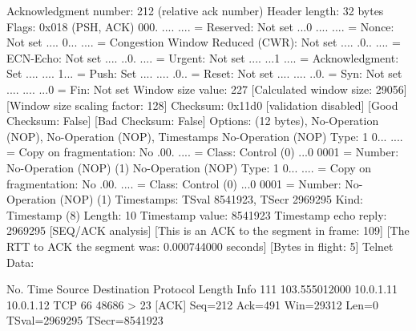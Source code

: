     Acknowledgment number: 212    (relative ack number)
    Header length: 32 bytes
    Flags: 0x018 (PSH, ACK)
        000. .... .... = Reserved: Not set
        ...0 .... .... = Nonce: Not set
        .... 0... .... = Congestion Window Reduced (CWR): Not set
        .... .0.. .... = ECN-Echo: Not set
        .... ..0. .... = Urgent: Not set
        .... ...1 .... = Acknowledgment: Set
        .... .... 1... = Push: Set
        .... .... .0.. = Reset: Not set
        .... .... ..0. = Syn: Not set
        .... .... ...0 = Fin: Not set
    Window size value: 227
    [Calculated window size: 29056]
    [Window size scaling factor: 128]
    Checksum: 0x11d0 [validation disabled]
        [Good Checksum: False]
        [Bad Checksum: False]
    Options: (12 bytes), No-Operation (NOP), No-Operation (NOP), Timestamps
        No-Operation (NOP)
            Type: 1
                0... .... = Copy on fragmentation: No
                .00. .... = Class: Control (0)
                ...0 0001 = Number: No-Operation (NOP) (1)
        No-Operation (NOP)
            Type: 1
                0... .... = Copy on fragmentation: No
                .00. .... = Class: Control (0)
                ...0 0001 = Number: No-Operation (NOP) (1)
        Timestamps: TSval 8541923, TSecr 2969295
            Kind: Timestamp (8)
            Length: 10
            Timestamp value: 8541923
            Timestamp echo reply: 2969295
    [SEQ/ACK analysis]
        [This is an ACK to the segment in frame: 109]
        [The RTT to ACK the segment was: 0.000744000 seconds]
        [Bytes in flight: 5]
Telnet
    Data: 

No.     Time           Source                Destination           Protocol Length Info
    111 103.555012000  10.0.1.11             10.0.1.12             TCP      66     48686 > 23 [ACK] Seq=212 Ack=491 Win=29312 Len=0 TSval=2969295 TSecr=8541923

